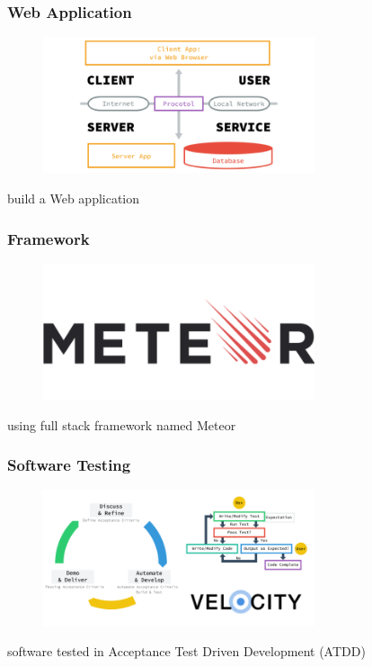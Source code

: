 \documentclass[10pt, compress]{beamer}
\begin{document}

\begin{frame}[fragile]
  \frametitle{Web Application}
  \centering

  \begin{figure}[ht]
    \includegraphics[width=8cm]{include/literature-webapp.png}
  \end{figure}

  build a \alert{Web application}\\

\end{frame}


\begin{frame}[fragile]
  \frametitle{Framework}
  \centering

  \begin{figure}[ht]
    \includegraphics[width=8cm]{include/literature-framework.png}
  \end{figure}

  using \alert{full stack framework} named \alert{Meteor}

\end{frame}


\begin{frame}[fragile]
  \frametitle{Software Testing}
  \centering

  \begin{figure}[ht]
    \includegraphics[width=8cm]{include/literature-testing.png}
  \end{figure}

  \alert{software tested} in Acceptance Test Driven Development (\alert{ATDD})

\end{frame}
\end{document}
